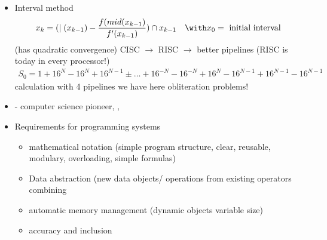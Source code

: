 \begin{itemize}
\begin{align*}
	\end{align*}
	\item Interval  method
	\begin{align*}
		x_k=(\mid(x_{k-1})-\frac{f(mid(x_{k-1})}{f'(x_{k-1})})\cap x_{k-1} \quad \with x_0 = \text{ initial interval} 
	\end{align*}
	(has quadratic convergence)
	\newline CISC $\to$ RISC $\to$ better pipelines (RISC is today in every processor!)
	\begin{align*}
		S_0=1+16^N-16^N+16^{N-1}\pm \dots +16^{-N}-16^{-N}+16^N-16^{N-1}+16^{N-1}-16^{N-1}
	\end{align*}
	calculation with 4 pipelines 
	we have here obliteration problems!
	\item {} - computer science pioneer, ,  
	\item Requirements for programming systems
	\begin{itemize}
		\item mathematical notation (simple program structure, clear, reusable, modulary, overloading, simple formulas)
		\item Data abstraction (new data objects/ operations from existing operators combining
		\item automatic memory management (dynamic objects variable size)
		\item accuracy and inclusion
	\end{itemize}
\end{itemize}